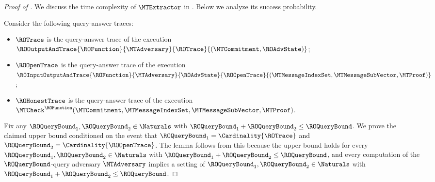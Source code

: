 \begin{proof}[Proof of ]
We discuss the time complexity of $\MTExtractor$ in . Below we analyze its success probability.

Consider the following query-answer traces:
\begin{itemize}[noitemsep]
  \item $\ROTrace$ is the query-answer trace of the execution $\ROOutputAndTrace{\ROFunction}{\MTAdversary}{\ROTrace}{(\MTCommitment,\ROAdvState)}$;
  \item $\ROOpenTrace$ is the query-answer trace of the execution
  $\ROInputOutputAndTrace{\ROFunction}{\MTAdversary}{\ROAdvState}{\ROOpenTrace}{(\MTMessageIndexSet,\MTMessageSubVector,\MTProof)}$;
  \item $\ROHonestTrace$ is the query-answer trace of the execution $\MTCheck^{\ROFunction}(\MTCommitment,\MTMessageIndexSet,\MTMessageSubVector,\MTProof)$.
\end{itemize}

Fix any $\ROQueryBound_{1},\ROQueryBound_{2} \in \Naturals$ with $\ROQueryBound_{1} + \ROQueryBound_{2} \leq \ROQueryBound$. We prove the claimed upper bound conditioned on the event that $\ROQueryBound_{1} = \Cardinality{\ROTrace}$ and $\ROQueryBound_{2} = \Cardinality{\ROOpenTrace}$. The lemma follows from this because the upper bound holds for every $\ROQueryBound_{1},\ROQueryBound_{2} \in \Naturals$ with $\ROQueryBound_{1} + \ROQueryBound_{2} \leq \ROQueryBound$, and every computation of the $\ROQueryBound$-query adversary $\MTAdversary$ implies a setting of $\ROQueryBound_{1},\ROQueryBound_{2} \in \Naturals$ with $\ROQueryBound_{1} + \ROQueryBound_{2} \leq \ROQueryBound$.


\end{proof}
